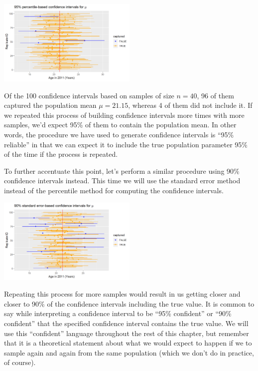 \documentclass[]{article}
\begin{document}
\begin{center}
\includegraphics[width=0.5\textwidth]{ci_95.png}
\end{center}

Of the 100 confidence intervals based on samples of size \(n = 40\), 96
of them captured the population mean \(\mu=21.15\), whereas 4 of them
did not include it. If we repeated this process of building confidence
intervals more times with more samples, we'd expect 95\% of them to
contain the population mean. In other words, the procedure we have used
to generate confidence intervals is ``95\% reliable'' in that we can
expect it to include the true population parameter 95\% of the time if
the process is repeated.

To further accentuate this point, let's perform a similar procedure
using 90\% confidence intervals instead. This time we will use the
standard error method instead of the percentile method for computing the
confidence intervals.

\begin{center}
\includegraphics[width=0.5\textwidth]{ci_90.png}
\end{center}

Repeating this process for more samples would result in us getting
closer and closer to 90\% of the confidence intervals including the true
value. It is common to say while interpreting a confidence interval to
be ``95\% confident'' or ``90\% confident'' that the specified
confidence interval contains the true value. We will use this
``confident'' language throughout the rest of this chapter, but remember
that it is a theoretical statement about what we would expect to happen
if we to sample again and again from the same population (which we don't
do in practice, of course).
\end{document}
